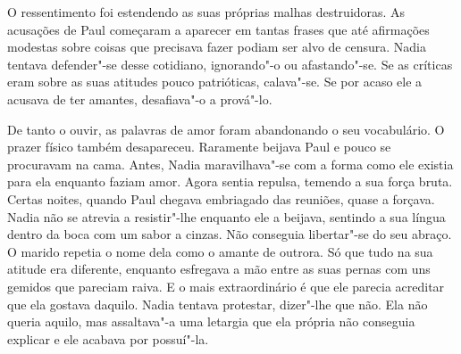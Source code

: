 O ressentimento foi estendendo as suas próprias malhas destruidoras. As
acusações de Paul começaram a aparecer em tantas frases que até
afirmações modestas sobre coisas que precisava fazer podiam ser alvo
de censura. Nadia tentava defender"-se desse cotidiano, ignorando"-o ou
afastando"-se. Se as críticas eram sobre as suas atitudes pouco
patrióticas, calava"-se. Se por acaso ele a acusava de ter amantes,
desafiava"-o a prová"-lo.

De tanto o ouvir, as palavras de amor foram abandonando o seu
vocabulário. O prazer físico também desapareceu. Raramente beijava
Paul e pouco se procuravam na cama. Antes, Nadia maravilhava"-se com a
forma como ele existia para ela enquanto faziam amor. Agora sentia
repulsa, temendo a sua força bruta. Certas noites, quando Paul chegava
embriagado das reuniões, quase a forçava. Nadia não se atrevia a
resistir"-lhe enquanto ele a beijava, sentindo a sua língua dentro da
boca com um sabor a cinzas. Não conseguia libertar"-se do seu abraço. O marido repetia o nome
dela como o amante de outrora. Só que tudo na sua atitude era diferente,
enquanto esfregava a mão entre as suas pernas com uns gemidos que
pareciam raiva. E o mais extraordinário é que ele parecia acreditar que
ela gostava daquilo. Nadia tentava protestar, dizer"-lhe que não. Ela não
queria aquilo, mas assaltava"-a uma letargia que ela própria não
conseguia explicar e ele acabava por possuí"-la.


